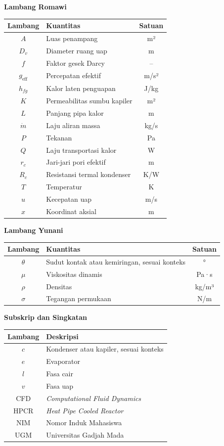 \documentclass[
  indonesian,
  12pt,
  a4paper,
]{report}
\newcounter{none} %
\begin{document}
\textbf{Lambang Romawi}

{\def\LTcaptype{none} %
\begin{longtable}[]{@{}clc@{}}
\toprule\noalign{}
Lambang & Kuantitas & Satuan \\
\midrule\noalign{}
\endhead
\bottomrule\noalign{}
\endlastfoot
\(A\) & Luas penampang & m² \\
\(D_v\) & Diameter ruang uap & m \\
\(f\) & Faktor gesek Darcy & -- \\
\(g_{\mathrm{eff}}\) & Percepatan efektif & m/s² \\
\(h_{fg}\) & Kalor laten penguapan & J/kg \\
\(K\) & Permeabilitas sumbu kapiler & m² \\
\(L\) & Panjang pipa kalor & m \\
\(\dot m\) & Laju aliran massa & kg/s \\
\(P\) & Tekanan & Pa \\
\(Q\) & Laju transportasi kalor & W \\
\(r_c\) & Jari-jari pori efektif & m \\
\(R_c\) & Resistansi termal kondenser & K/W \\
\(T\) & Temperatur & K \\
\(u\) & Kecepatan uap & m/s \\
\(x\) & Koordinat aksial & m \\
\end{longtable}
}

\textbf{Lambang Yunani}

{\def\LTcaptype{none} %
\begin{longtable}[]{@{}clc@{}}
\toprule\noalign{}
Lambang & Kuantitas & Satuan \\
\midrule\noalign{}
\endhead
\bottomrule\noalign{}
\endlastfoot
\(\theta\) & Sudut kontak atau kemiringan, sesuai konteks & ° \\
\(\mu\) & Viskositas dinamis & Pa·s \\
\(\rho\) & Densitas & kg/m³ \\
\(\sigma\) & Tegangan permukaan & N/m \\
\end{longtable}
}

\textbf{Subskrip dan Singkatan}

{\def\LTcaptype{none} %
\begin{longtable}[]{@{}cl@{}}
\toprule\noalign{}
Lambang & Deskripsi \\
\midrule\noalign{}
\endhead
\bottomrule\noalign{}
\endlastfoot
\(c\) & Kondenser atau kapiler, sesuai konteks \\
\(e\) & Evaporator \\
\(l\) & Fasa cair \\
\(v\) & Fasa uap \\
CFD & \emph{Computational Fluid Dynamics} \\
HPCR & \emph{Heat Pipe Cooled Reactor} \\
NIM & Nomor Induk Mahasiswa \\
UGM & Universitas Gadjah Mada \\
\end{longtable}
}
\end{document}
